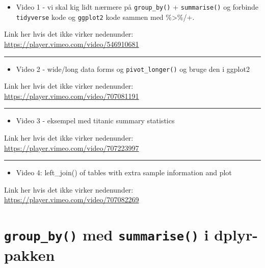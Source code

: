 \documentclass[
]{book}
\providecommand{\tightlist}{%
  \setlength{\itemsep}{0pt}\setlength{\parskip}{0pt}}
\begin{document}
\begin{itemize}
\tightlist
\item
  Video 1 - vi skal kig lidt nærmere på \texttt{group\_by()} + \texttt{summarise()} og forbinde \texttt{tidyverse} kode og \texttt{ggplot2} kode sammen med \%\textgreater\%/+.
\end{itemize}

Link her hvis det ikke virker nedenunder: \url{https://player.vimeo.com/video/546910681}

\begin{center}\rule{0.5\linewidth}{0.5pt}\end{center}

\begin{itemize}
\tightlist
\item
  Video 2 - wide/long data forms og \texttt{pivot\_longer()} og bruge den i ggplot2
\end{itemize}

Link her hvis det ikke virker nedenunder: \url{https://player.vimeo.com/video/707081191}

\begin{center}\rule{0.5\linewidth}{0.5pt}\end{center}

\begin{itemize}
\tightlist
\item
  Video 3 - eksempel med titanic summary statistics
\end{itemize}

Link her hvis det ikke virker nedenunder: \url{https://player.vimeo.com/video/707223997}

\begin{center}\rule{0.5\linewidth}{0.5pt}\end{center}

\begin{itemize}
\tightlist
\item
  Video 4: left\_join() of tables with extra sample information and plot
\end{itemize}

Link her hvis det ikke virker nedenunder: \url{https://player.vimeo.com/video/707082269}

\hypertarget{group_by-med-summarise-i-dplyr-pakken}{%
\section{\texorpdfstring{\texttt{group\_by()} med \texttt{summarise()} i dplyr-pakken}{group\_by() med summarise() i dplyr-pakken}}\label{group_by-med-summarise-i-dplyr-pakken}}
\end{document}
